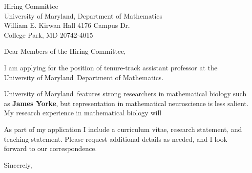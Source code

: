 \documentclass[11pt,a4paper]{letter}
\begin{document}
\def\School{University of Maryland}
\begin{letter}
{Hiring Committee\\
University of Maryland, Department of Mathematics\\
William E. Kirwan Hall 4176 Campus Dr.\\
College Park, MD 20742-4015}


\opening{Dear Members of the Hiring Committee,}

I am applying for the position of tenure-track assistant professor at the \School~Department of Mathematics. 



\School~features strong researchers in mathematical biology such as \textbf{James Yorke}, but representation in mathematical neuroscience is less salient. My research experience in mathematical biology will 



As part of my application I include a curriculum vitae, research statement, and teaching statement. Please request additional details as needed, and I look forward to our correspondence.

\closing{Sincerely,}
\end{letter}
\end{document}
